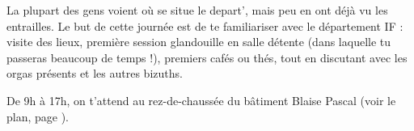 La plupart des gens voient où se situe le depart', mais peu en ont déjà
vu les entrailles. Le but de cette journée est de te familiariser avec le
département IF : visite des lieux, première session glandouille en salle
détente (dans laquelle tu passeras beaucoup de temps !), premiers cafés ou
thés, tout en discutant avec les orgas présents et les autres bizuths.

De 9h à 17h, on t'attend au rez-de-chaussée du bâtiment Blaise Pascal
(voir le plan, page \pageref{plan}).
